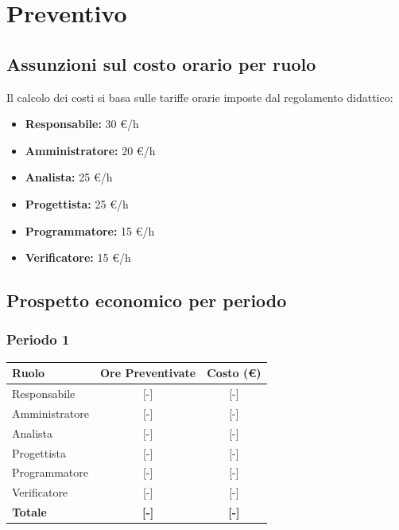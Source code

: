 \section{Preventivo}

\subsection{Assunzioni sul costo orario per ruolo}
Il calcolo dei costi si basa sulle tariffe orarie imposte dal regolamento didattico:
\begin{itemize}
	\item \textbf{Responsabile:} 30 \euro/h
	\item \textbf{Amministratore:} 20 \euro/h
	\item \textbf{Analista:} 25 \euro/h
	\item \textbf{Progettista:} 25 \euro/h
	\item \textbf{Programmatore:} 15 \euro/h
	\item \textbf{Verificatore:} 15 \euro/h
\end{itemize}

\subsection{Prospetto economico per periodo}

\subsubsection{Periodo 1}
\begin{table}[ht]
	\centering
	\renewcommand{\arraystretch}{1.3}
	\begin{tabularx}{\textwidth}{X c c}
		\toprule
		\textbf{Ruolo} & \textbf{Ore Preventivate} & \textbf{Costo (\euro)} \\
		\midrule
		Responsabile & [-] & [-] \\
		Amministratore & [-] & [-] \\
		Analista & [-] & [-] \\
		Progettista & [-] & [-] \\
		Programmatore & [-] & [-] \\
		Verificatore & [-] & [-] \\
		\midrule
		\textbf{Totale} & \textbf{[-]} & \textbf{[-]} \\
		\bottomrule
	\end{tabularx}
\end{table}

